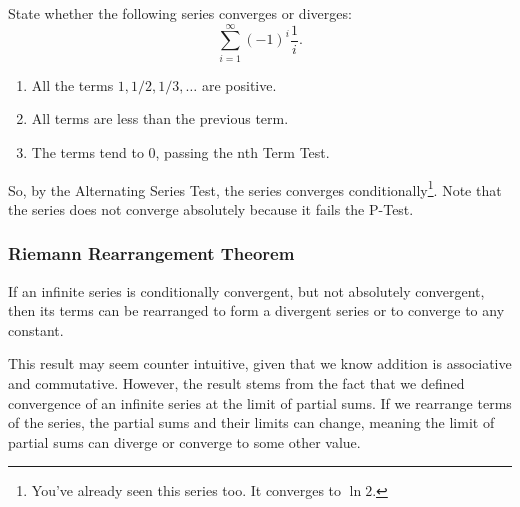 \begin{example}
	State whether the following series converges or diverges:
	\begin{equation*}
		\sum_{i=1}^{\infty}{(-1)^i\frac{1}{i}}.
	\end{equation*}
\end{example}
\begin{answer}
	\begin{enumerate}
		\item All the terms $1, 1/2, 1/3, \ldots$ are positive.
		\item All terms are less than the previous term.
		\item The terms tend to 0, passing the nth Term Test.
	\end{enumerate}
	
	So, by the Alternating Series Test, the series converges conditionally\footnote{You've already seen this series too. It converges to $\ln{2}$.}.
	Note that the series does not converge absolutely because it fails the P-Test.
\end{answer}

\subsubsection{Riemann Rearrangement Theorem}
\begin{theorem}
	If an infinite series is conditionally convergent, but not absolutely convergent, then its terms can be rearranged to form a divergent series or to converge to any constant.
\end{theorem}

This result may seem counter intuitive, given that we know addition is associative and commutative.
However, the result stems from the fact that we defined convergence of an infinite series at the limit of partial sums.
If we rearrange terms of the series, the partial sums and their limits can change, meaning the limit of partial sums can diverge or converge to some other value.